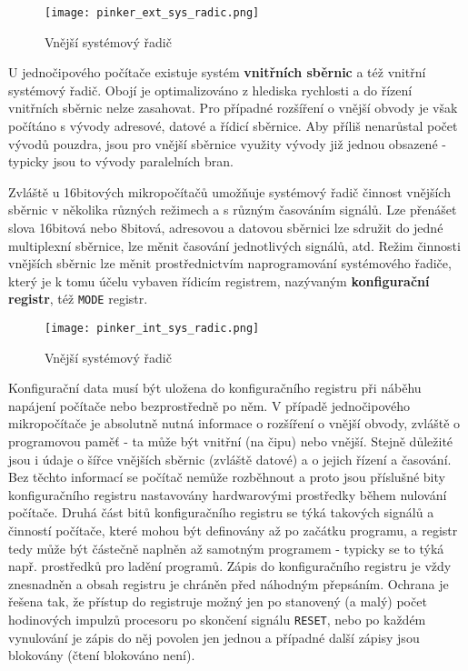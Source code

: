       \begin{figure}[ht!] %
        \centering
        \texttt{[image: pinker\_ext\_sys\_radic.png]}
        \caption{Vnější systémový řadič}
        \label{MIT:fig_ext_sys_radic}
      \end{figure}
      
      U jednočipového počítače existuje systém \textbf{vnitřních sběrnic} a též vnitřní systémový 
      řadič. Obojí je optimalizováno z hlediska rychlosti a do řízení vnitřních sběrnic nelze 
      zasahovat. Pro případné rozšíření o vnější obvody je však počítáno s vývody adresové, datové 
      a řídicí sběrnice. Aby příliš nenarůstal počet vývodů pouzdra, jsou pro vnější sběrnice 
      využity vývody již jednou obsazené - typicky jsou to vývody paralelních bran.
      
      Zvláště u 16bitových mikropočítačů umožňuje systémový řadič činnost vnějších sběrnic v 
      několika různých režimech a s různým časováním signálů. Lze přenášet slova 16bitová nebo 
      8bitová, adresovou a datovou sběrnici lze sdružit do jedné multiplexní sběrnice, lze měnit 
      časování jednotlivých signálů, atd. Režim činnosti vnějších sběrnic lze měnit prostřednictvím 
      naprogramování systémového řadiče, který je k tomu účelu vybaven řídicím registrem, nazývaným 
      \textbf{konfigurační registr}, též \texttt{MODE} registr.
       
      \begin{figure}[ht!] %
        \centering
        \texttt{[image: pinker\_int\_sys\_radic.png]}
        \caption{Vnější systémový řadič}
        \label{MIT:fig_int_sys_radic}
      \end{figure}
    
      Konfigurační data musí být uložena do konfiguračního registru při náběhu napájení počítače 
      nebo bezprostředně po něm. V případě jednočipového mikropočítače je absolutně nutná informace 
      o rozšíření o vnější obvody, zvláště o programovou paměť - ta může být vnitřní (na čipu) nebo 
      vnější. Stejně důležité jsou i údaje o šířce vnějších sběrnic (zvláště datové) a o jejich 
      řízení a časování. Bez těchto informací se počítač nemůže rozběhnout a proto jsou příslušné 
      bity konfiguračního registru nastavovány hardwarovými prostředky během nulování počítače. 
      Druhá část bitů konfiguračního registru se týká takových signálů a činností počítače, které 
      mohou být definovány až po začátku programu, a registr tedy může být částečně naplněn až 
      samotným programem - typicky se to týká např. prostředků pro ladění programů. Zápis do 
      konfiguračního registru je vždy znesnadněn a obsah registru je chráněn před náhodným 
      přepsáním. Ochrana je řešena tak, že přístup do registruje možný jen po stanovený (a malý) 
      počet hodinových impulzů procesoru po skončení signálu \texttt{RESET}, nebo po každém 
      vynulování je zápis do něj povolen jen jednou a případné další zápisy jsou blokovány (čtení 
      blokováno není).
      
